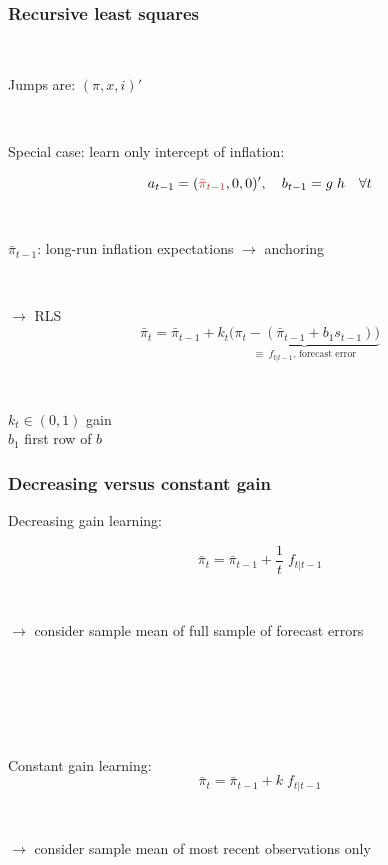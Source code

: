 \documentclass[10pt]{beamer}
\begin{document}
\begin{frame}
	\frametitle{Recursive least squares}
	\label{RLS_special}
	
	\
	
Jumps are: $(\pi, x, i)'$ 	

\
\pause
\

Special case: learn only intercept of inflation:

\begin{equation}
a_{t-1} = ( \textcolor{brownreddark}{\bar{\pi}_{t-1}},0,0)', \quad b_{t-1} = g\; h \quad \forall t
\end{equation}

\
\pause
\

 \textcolor{brownreddark}{$\bar{\pi}_{t-1}$}: long-run inflation expectations $\rightarrow$ anchoring

\
\pause
\

$\rightarrow$ RLS
\begin{equation}
\bar{\pi}_{t}  =\bar{\pi}_{t-1} +k_t \underbrace{\big(\pi_{t} -(\bar{\pi}_{t-1}+b_1 s_{t-1}) \big)}_{\equiv \; f_{t|t-1} \text{, forecast error} } 
\end{equation}
 
 \
 
 $k_t \in (0,1)$ gain \\
 $b_1$ first row of $b$
\vfill 

\hfill \hyperlink{RLS}{}




\end{frame}

\begin{frame}
	\frametitle{Decreasing versus constant gain}
	\label{cgain_dgain}
	
Decreasing gain learning:

\begin{equation}
\bar{\pi}_{t}  =\bar{\pi}_{t-1} +\frac{1}{t} \; f_{t|t-1}
\end{equation}
 
 \
 
 $\rightarrow$ consider sample mean of full sample of forecast errors
 
\

\pause

\

\

Constant gain learning:
\begin{equation}
\bar{\pi}_{t}  =\bar{\pi}_{t-1} +k \; f_{t|t-1}
\end{equation}

 \
 
 $\rightarrow$ consider sample mean of most recent observations only 

\end{frame}
\end{document}
